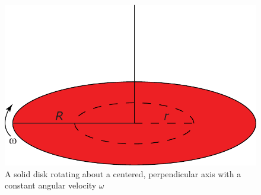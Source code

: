 \begin{figure}[H]
  \centering
  \includegraphics[width=0.35\linewidth]{fig/images/rotating_disk.pdf}
  \caption{A solid disk rotating about a centered, perpendicular axis with a constant angular velocity $\omega$}
  \label{fig:rotating_disk}
\end{figure}